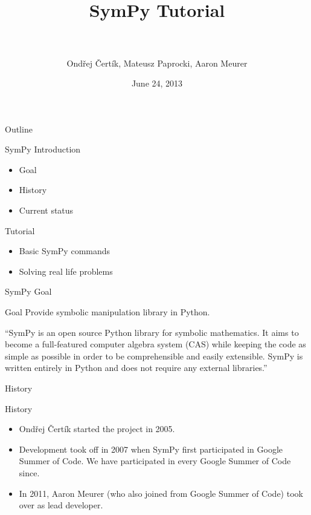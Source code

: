 \documentclass[xcolor=svgnames]{beamer}
\title[SymPy\hspace{4em}\insertframenumber/
\inserttotalframenumber]{~\\ SymPy Tutorial \\~}
\author[O. Čertík, M. Paprocki, A. Meurer]
{Ondřej Čertík, Mateusz Paprocki, Aaron Meurer}
\institute{\pgfuseimage{mylogo}}
\date{June 24, 2013}
\begin{document}
\begin{frame}
  \maketitle
\end{frame}

\begin{frame}{Outline}
  \begin{block}{SymPy Introduction}
    \begin{itemize}
    \item Goal
    \item History
    \item Current status
    \end{itemize}
  \end{block}

  \begin{block}{Tutorial}
    \begin{itemize}
    \item Basic SymPy commands
    \item Solving real life problems
    \end{itemize}
  \end{block}
\end{frame}

\begin{frame}{SymPy Goal}
  \begin{block}{Goal}
    Provide symbolic manipulation library in Python.
  \end{block}
  \pause
  \begin{block}

    ``SymPy is an open source Python library for symbolic mathematics. It aims to
    become a full-featured computer algebra system (CAS) while keeping the code as
    simple as possible in order to be comprehensible and easily extensible. SymPy
    is written entirely in Python and does not require any external libraries.''

  \end{block}
\end{frame}

\begin{frame}{History}
  \begin{block}{History}
    \begin{itemize}
    \item Ondřej Čertík started the project in 2005.
    \item Development took off in 2007 when SymPy first participated in Google
      Summer of Code. We have participated in every Google Summer of Code since.
    \item In 2011, Aaron Meurer (who also joined from Google Summer of Code) took
      over as lead developer.
    \end{itemize}
  \end{block}
\end{frame}
\end{document}
